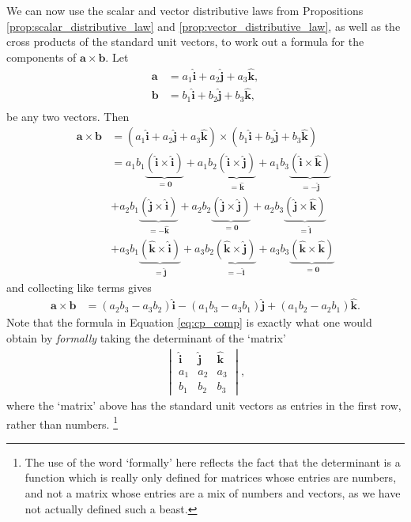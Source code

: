 \documentclass[12pt,letterpaper,reqno]{article}
\numberwithin{equation}{section}
\begin{document}
We can now use the scalar and vector distributive laws from Propositions \ref{prop:scalar_distributive_law} and \ref{prop:vector_distributive_law}, as well as the cross products of the standard unit vectors, to work out a formula for the components of $\mathbf{a} \times \mathbf{b}$. Let 
	\begin{align*}
	\mathbf{a}&=a_1\mathbf{\hat{i}}+a_2\mathbf{\hat{j}}+a_3\mathbf{\hat{k}}, \\
	\mathbf{b}&=b_1\mathbf{\hat{i}}+b_2\mathbf{\hat{j}}+b_3\mathbf{\hat{k}}, \\
\end{align*}
be any two vectors. Then
\begin{align*}
	\mathbf{a} \times \mathbf{b}&=(a_1\mathbf{\hat{i}}+a_2\mathbf{\hat{j}}+a_3\mathbf{\hat{k}}) \times (b_1\mathbf{\hat{i}}+b_2\mathbf{\hat{j}}+b_3\mathbf{\hat{k}}) \\
	&=a_1b_1\underbrace{(\mathbf{\hat{i}} \times \mathbf{\hat{i}})}_{=\mathbf{0}}+a_1b_2\underbrace{(\mathbf{\hat{i}} \times \mathbf{\hat{j}})}_{=\mathbf{\hat{k}}}+a_1b_3\underbrace{(\mathbf{\hat{i}} \times \mathbf{\hat{k}})}_{=-\mathbf{\hat{j}}} \\
	&+a_2b_1\underbrace{(\mathbf{\hat{j}} \times \mathbf{\hat{i}})}_{=-\mathbf{\hat{k}}}+a_2b_2\underbrace{(\mathbf{\hat{j}} \times \mathbf{\hat{j}})}_{=\mathbf{0}}+a_2b_3\underbrace{(\mathbf{\hat{j}} \times \mathbf{\hat{k}})}_{=\mathbf{\hat{i}}} \\
	&+a_3b_1\underbrace{(\mathbf{\hat{k}} \times \mathbf{\hat{i}})}_{=\mathbf{\hat{j}}}+a_3b_2\underbrace{(\mathbf{\hat{k}} \times \mathbf{\hat{j}})}_{=-\mathbf{\hat{i}}}+a_3b_3\underbrace{(\mathbf{\hat{k}} \times \mathbf{\hat{k}})}_{=\mathbf{0}}
	\end{align*}
	and collecting like terms gives
	\begin{align}\label{eq:cp_comp}
		\mathbf{a} \times \mathbf{b}&=(a_2b_3-a_3b_2)\mathbf{\hat{i}}-(a_1b_3-a_3b_1)\mathbf{\hat{j}}+(a_1b_2-a_2b_1)\mathbf{\hat{k}}.
	\end{align}
Note that the formula in Equation \eqref{eq:cp_comp} is exactly what one would obtain by \emph{formally} taking the determinant of the `matrix'
\begin{align*}
	\begin{vmatrix}
		\mathbf{\hat{i}} & \mathbf{\hat{j}} & \mathbf{\hat{k}} \\
		a_1 & a_2 & a_3 \\
		b_1 & b_2 & b_3 
	\end{vmatrix},
\end{align*}
where the `matrix' above has the standard unit vectors as entries in the first row, rather than numbers. \footnote{The use of the word `formally' here reflects the fact that the determinant is a function which is really only defined for matrices whose entries are numbers, and not a matrix whose entries are a mix of numbers and vectors, as we have not actually defined such a beast.}
\end{document}
